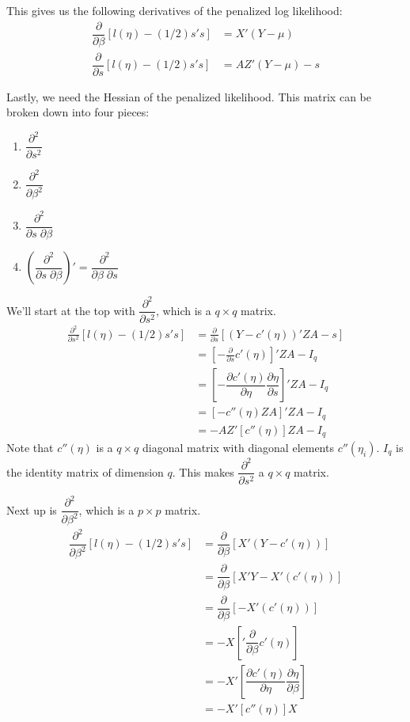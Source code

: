 \documentclass{article}
\begin{document}
This gives us the following derivatives of the penalized log likelihood:
\begin{align}
\dfrac{\partial}{\partial \beta} \left[ l(\eta)-(1/2)s's \right]&= X' (Y-\mu)\\
\dfrac{\partial}{\partial s} \left[ l(\eta)-(1/2)s's \right]&= AZ' (Y-\mu)  -s
\end{align}

Lastly, we need the Hessian of the penalized likelihood. This matrix can be broken down into four pieces: 
\begin{enumerate}
\item $ \dfrac{\partial^2}{\partial s^2}$
\item $ \dfrac{\partial^2}{\partial \beta^2}$
\item $\dfrac{\partial^2}{ \partial s \; \partial \beta}$
\item $\left(\dfrac{\partial^2}{ \partial s \; \partial \beta}\right) ' =\dfrac{\partial^2}{ \partial \beta \; \partial s}$
\end{enumerate}

We'll start at the top with  $ \dfrac{\partial^2}{\partial s^2}$, which is a $q \times q$ matrix.
\begin{align}
  \frac{\partial^2}{\partial s^2}  \left[ l(\eta) - (1/2) s's   \right] &=   \frac{\partial}{\partial s} \left[ (Y-c'(\eta))'ZA -s   \right]\\
&=\left[- \frac{\partial}{\partial s} c'(\eta)\right]'ZA - I_q \\
&= \left[-\dfrac{\partial c'(\eta)}{\partial \eta} \dfrac{\partial \eta}{\partial s}   \right] 'ZA - I_q \\
&= \left[ -c''(\eta) ZA  \right]'ZA - I_q \\
&= -AZ' \left[ c''(\eta) \right] ZA - I_q
\end{align}
Note that $c''(\eta)$ is a $q\times q$ diagonal matrix with diagonal elements $c''(\eta_i)$.  $I_q$ is the identity matrix of dimension $q$.  This makes  $ \dfrac{\partial^2}{\partial s^2}$ a $q \times q$ matrix.

Next up is  $ \dfrac{\partial^2}{\partial \beta^2}$, which is a $p \times p$ matrix.
\begin{align}
  \dfrac{\partial^2}{\partial \beta^2}  \left[ l(\eta) - (1/2) s's   \right] &=   \dfrac{\partial}{\partial \beta} \left[ X' (Y-c'(\eta))  \right]\\
&= \dfrac{\partial}{\partial \beta} \left[ X' Y-X'(c'(\eta))  \right] \\
&= \dfrac{\partial}{\partial \beta} \left[ -X'(c'(\eta))  \right] \\
&=-X  \left[' \dfrac{\partial}{\partial \beta} c'(\eta)  \right] \\
&=-X'  \left[ \dfrac{\partial  c'(\eta)}{\partial \eta} \dfrac{\partial \eta}{\partial \beta}  \right] \\
&=-X'  \left[ c''(\eta)\right]  X   
\end{align}
\end{document}
